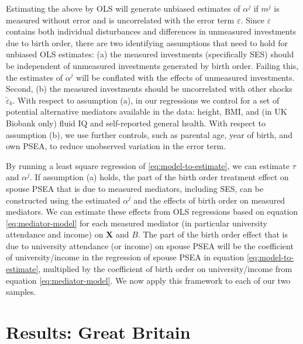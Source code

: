 \documentclass[
  12pt,
]{article}
\theoremstyle{definition}
\theoremstyle{definition}
\theoremstyle{definition}
\theoremstyle{definition}
\theoremstyle{remark}
\begin{document}
Estimating the above by OLS will generate unbiased estimates of
\(\alpha^j\) if \(m^j\) is measured without error and is
uncorrelated with the error term \(\varepsilon\). Since
\(\varepsilon\) contains both individual disturbances and differences
in unmeasured investments due to birth order, there are two identifying assumptions that need to hold for unbiased OLS estimates: (a) the measured investments
(specifically SES) should be independent of unmeasured investments
generated by birth order. Failing this, the estimates of \(\alpha^j\) will be
conflated with the effects of unmeasured investments. Second, (b) the measured
investments should be uncorrelated with other shocks \(\tilde{\varepsilon}_b\).
With respect to assumption (a), in our regressions we control for a set of
potential alternative mediators available in the data: height,
BMI, and (in UK Biobank only) fluid IQ and self-reported general health. With
respect to assumption (b), we use further controls, such as parental age,
year of birth, and own PSEA, to reduce unobserved variation in the error term.

By running a least square regression of \eqref{eq:model-to-estimate}, we can
estimate \(\tau\) and \(\alpha^j\). If assumption (a) holds, the part of the birth
order treatment effect on spouse PSEA that is due to measured mediators,
including SES, can be constructed using the estimated \(\alpha^j\) and the effects
of birth order on measured mediators. We can estimate these effects from OLS
regressions based on equation \eqref{eq:mediator-model} for each
measured mediator (in particular university attendance and income) on
\(\mathbf{X}\) and \(B\). The part of the birth order effect that is due to
university attendance (or income) on spouse PSEA will be the coefficient of
university/income in the regression of spouse PSEA in equation
\eqref{eq:model-to-estimate}, multiplied by the coefficient of birth order on
university/income from equation \eqref{eq:mediator-model}. We now apply this
framework to each of our two samples.

\hypertarget{results-great-britain}{%
\section{Results: Great Britain}\label{results-great-britain}}

 
  \providecommand{\huxb}[2]{\arrayrulecolor[RGB]{#1}\global\arrayrulewidth=#2pt}
  \providecommand{\huxvb}[2]{\color[RGB]{#1}\vrule width #2pt}
  \providecommand{\huxtpad}[1]{\rule{0pt}{#1}}
  \providecommand{\huxbpad}[1]{\rule[-#1]{0pt}{#1}}
\end{document}
